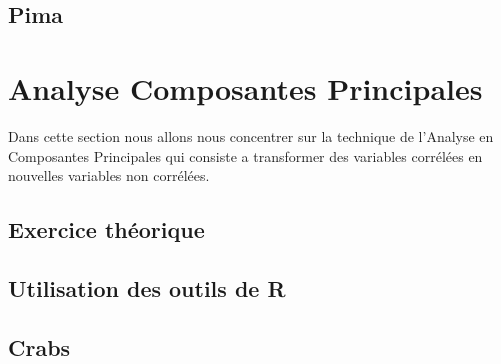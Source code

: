 \documentclass[10pt]{article}
\begin{document}
\subsection{Pima}
\pagebreak

\section{Analyse Composantes Principales}
Dans cette section nous allons nous concentrer sur la technique de l’Analyse en Composantes Principales qui consiste a transformer des variables corrélées en nouvelles variables non corrélées.
 \subsection{Exercice théorique}
\subsection{Utilisation des outils de R}
\subsection{Crabs}
\end{document}
